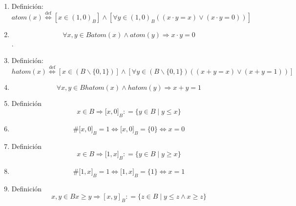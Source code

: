 \begin{enumerate}
\begin{enumerate}
\begin{enumerate}
\begin{enumerate}
        \begin{enumerate}
        \def\labelenumv{\arabic{enumv}.}
        \tightlist
        \item
          \[{x \geq {y \land y}} \geq z\]
        \item
          \[{{x + y} = {{x \land y} + z}} = y\]
        \item
          \[{{x + y} + z} = {x + z}\]
        \item
          \[{x + y} = {x + z}\]
        \item
          \[x = {x + z}\]
        \item
          \[x \geq z\]
        \end{enumerate}
      \end{enumerate}
    \item
      Definición:\[\mathit{atom}{(x)}\overset{\text{def}}{\Leftrightarrow}{\left\lbrack {x \in (1,0)_{B}} \right\rbrack \land \left\lbrack {\forall{y \in (1,0)_{B}}\left( {\left( {{x \cdot y} = x} \right) \vee \left( {{x \cdot y} = 0} \right)} \right)} \right\rbrack}\]
    \item
      \[\forall x,{y \in B}\mathit{atom}{{(x)} \land \mathit{atom}}{(y)}\Rightarrow{{x \cdot y} = 0}\].
    \item
      Definición:\[\mathit{hatom}{(x)}\overset{\text{def}}{\Leftrightarrow}{\left\lbrack {x \in \left( {B \smallsetminus {\{ 0,1\}}} \right)} \right\rbrack \land \left\lbrack {\forall{y \in \left( {B \smallsetminus {\{ 0,1\}}} \right)}\left( {\left( {{x + y} = x} \right) \vee \left( {{x + y} = 1} \right)} \right)} \right\rbrack}\]
    \item
      \[\forall x,{y \in B}\mathit{hatom}{{(x)} \land \mathit{hatom}}{(y)}\Rightarrow{{x + y} = 1}\]
    \item
      Definición\[{x \in B}\Rightarrow{\lbrack{x,0}\rbrack}_{B}{: = {\{{{y \in B} \mid {y \leq x}}\}}}\]
    \item
      \[\#{{\lbrack{x,0}\rbrack}_{B} = 1}\Leftrightarrow{{\lbrack{x,0}\rbrack}_{B} = {\{ 0\}}}\Leftrightarrow{x = 0}\]
    \item
      Definición\[{x \in B}\Rightarrow{\lbrack{1,x}\rbrack}_{B}{: = {\{{{y \in B} \mid {y \geq x}}\}}}\]
    \item
      \[\#{{\lbrack{1,x}\rbrack}_{B} = 1}\Leftrightarrow{{\lbrack{1,x}\rbrack}_{B} = {\{ 1\}}}\Leftrightarrow{x = 1}\]
    \item
      Definición\[x,{y \in B}{x \geq y}\Rightarrow\left\lbrack {x,y} \right\rbrack_{B}{: = {\{{{z \in B} \mid {{y \leq {z \land x}} \geq z}}\}}}\]

\end{enumerate}
\end{enumerate}
\end{enumerate}
